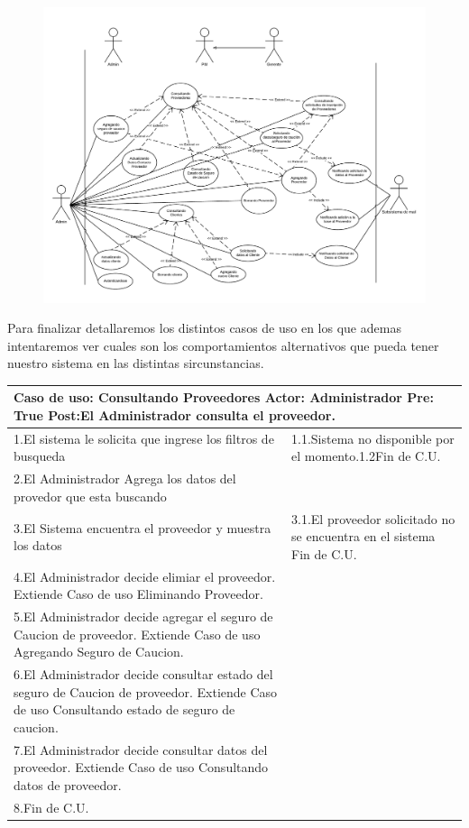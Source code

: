 \begin{figure}[H]
\includegraphics[width=\linewidth]{cu6.pdf}
\end{figure}

Para finalizar detallaremos los distintos casos de uso en los que ademas intentaremos ver cuales son los comportamientos alternativos que pueda tener nuestro sistema en las distintas sircunstancias.

\begin{longtable}{| p{} | p{} |} 
    \hline
    \multicolumn{2}{|p{16cm}|}{
        \textbf{Caso de uso:} Consultando Proveedores \newline
        \textbf{Actor:} Administrador\newline
        \textbf{Pre:}  True\newline
        \textbf{Post:}El Administrador consulta el proveedor.
    }\\
    \hline
    1.El sistema le solicita que ingrese los filtros de busqueda  & 1.1.Sistema no  disponible por el momento.\newline 1.2Fin de C.U.\\
    \hline
    2.El Administrador Agrega los datos del provedor que esta buscando& \\
    \hline
    3.El Sistema encuentra el proveedor y muestra los datos & 3.1.El proveedor solicitado no se encuentra en el sistema \newline 3.2 Fin de C.U.  \\
    \hline
    4.El Administrador decide elimiar el proveedor. Extiende Caso de uso Eliminando Proveedor.& \\
    \hline
    5.El Administrador decide agregar el seguro de Caucion de proveedor. Extiende Caso de uso Agregando Seguro de Caucion.& \\
    \hline
    6.El Administrador decide consultar estado del seguro de Caucion de proveedor. Extiende Caso de uso Consultando estado de seguro de caucion.& \\
    \hline
    7.El Administrador decide consultar datos del proveedor. Extiende Caso de uso Consultando datos de proveedor.& \\
    \hline
    8.Fin de C.U.& \\
    \hline
\end{longtable}

